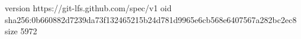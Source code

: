 version https://git-lfs.github.com/spec/v1
oid sha256:0b660882d7239da73f132465215b24d781d9965e6cb568e6407567a282bc2ec8
size 5972
